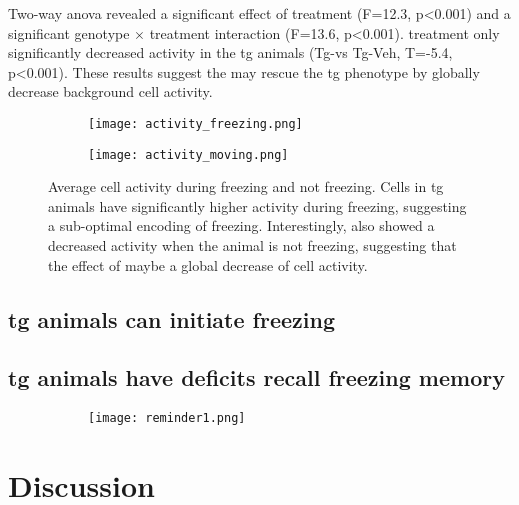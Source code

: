 Two-way \gls{anova} revealed a significant effect of treatment (F=12.3, p<0.001) and a significant genotype $\times$ treatment interaction (F=13.6, p<0.001). \tglu treatment only significantly decreased activity in the \gls{tg} animals (Tg-\glu vs Tg-Veh, T=-5.4, p<0.001). These results suggest the \tglu{} may rescue the \gls{tg} phenotype by globally decrease background cell activity.
\begin{figure}[h]
    \begin{subfigure}[h]{\textwidth}
        \texttt{[image: activity\_freezing.png]}
        \caption{\label{f.ad.actf}}
    \end{subfigure}
    \begin{subfigure}[h]{\textwidth}
        \texttt{[image: activity\_moving.png]}
        \caption{\label{f.ad.actnf}}
    \end{subfigure}
    \caption{Average cell activity during  freezing and  not freezing. Cells in \gls{tg} animals have significantly higher activity during freezing, suggesting a sub-optimal encoding of freezing. Interestingly, \tglu also showed a decreased activity when the animal is not freezing, suggesting that the effect of \tglu maybe a global decrease of cell activity. \label{f.ad.activity_freezing}}
\end{figure}



\subsection{\Gls{tg} animals can initiate freezing}



\subsection{\Gls{tg} animals have deficits recall freezing memory}
\begin{figure}[h]
    \begin{subfigure}[h]{\textwidth}
        \texttt{[image: reminder1.png]}
        \caption{\label{f.ad.actf}}
    \end{subfigure}
    \caption{ \label{f.ad.reminder1}}
\end{figure}

\section{Discussion}
